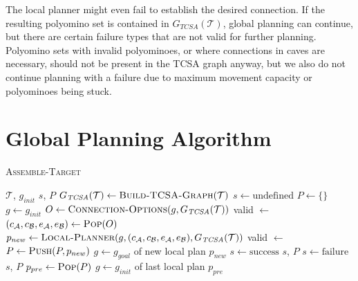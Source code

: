 The local planner might even fail to establish the desired connection.
If the resulting polyomino set is contained in $G_{\textit{TCSA}}(\mathcal{T})$, global planning can continue, but there are certain failure types that are not valid for further planning.
Polyomino sets with invalid polyominoes, or where connections in caves are necessary, should not be present in the TCSA graph anyway, but we also do not continue planning with a failure due to maximum movement capacity or polyominoes being stuck.

\section{Global Planning Algorithm}
\label{sec:global_algo}

\begin{algorithm}
	\caption{\scshape Assemble-Target}
	\label{algo:global_algo}
	\begin{algorithmic}[1]
		\REQUIRE $\mathcal{T}$, $g_{init}$
		\ENSURE $s$, $P$ 
		\STATE $G_{\textit{TCSA}}(\mathcal{T}) \gets \text{\scshape Build-TCSA-Graph}(\mathcal{T})$
		\STATE $s \gets \text{undefined}$
		\STATE $P \gets \{\}$ 
		\STATE $g \gets g_{init}$ 
		\LOOP
			\STATE $O \gets \text{\scshape Connection-Options}(g, G_{\textit{TCSA}}(\mathcal{T}))$
			\STATE valid $\gets$ \FALSE
				\STATE $(c_\mathcal{A}, c_\mathcal{B}, e_\mathcal{A}, e_\mathcal{B}) \gets \text{\scshape Pop}(O)$
				\STATE $p_{new} \gets \text{\scshape Local-Planner}(g, (c_\mathcal{A}, c_\mathcal{B}, e_\mathcal{A}, e_\mathcal{B}), G_{\textit{TCSA}}(\mathcal{T}))$
					\STATE valid $\gets$ \TRUE
				\ENDIF
			\ENDWHILE
				\STATE $P \gets \text{\scshape Push}(P, p_{new})$ 
				\STATE $g \gets g_{goal}$ of new local plan $p_{new}$ 
					\STATE $s \gets \text{success}$
					\RETURN $s$, $P$
				\ENDIF
			\ELSE
					\STATE $s \gets \text{failure}$
					\RETURN $s$, $P$
				\ENDIF
				\STATE $p_{pre} \gets \text{\scshape Pop}(P)$ 
				\STATE $g \gets g_{init}$ of last local plan $p_{pre}$ 
			\ENDIF
		\ENDLOOP
	\end{algorithmic}
\end{algorithm}

